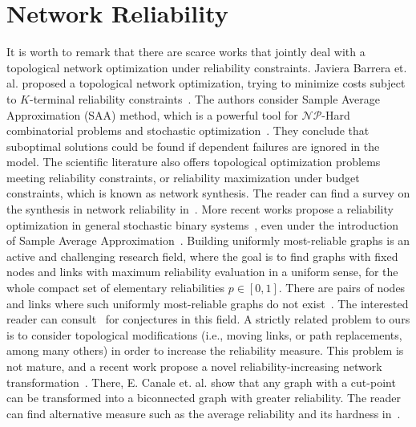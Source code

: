 \section{Network Reliability}
It is worth to remark that there are scarce works that jointly deal with a topological network optimization 
under reliability constraints. Javiera Barrera et. al. proposed a topological network optimization, trying to minimize costs subject to $K$-terminal reliability constraints~\cite{106}. The authors consider Sample Average Approximation (SAA) method, which is a powerful tool for $\mathcal{NP}$-Hard combinatorial problems and  stochastic optimization~\cite{112}. They conclude that suboptimal solutions could be found if dependent failures are ignored in the model. The scientific literature also offers topological optimization problems meeting reliability constraints, or reliability maximization under budget constraints, which is known as network synthesis. The reader can find a survey on the synthesis in network reliability in~\cite{113}. More recent works 
propose a reliability optimization in general stochastic binary systems~\cite{107}, even under the introduction of Sample Average Approximation~\cite{114}. Building uniformly most-reliable graphs is an active and challenging research field, where the goal is to find graphs with fixed nodes and links with maximum reliability evaluation in a uniform sense, for the whole compact set of elementary reliabilities $p\in [0,1]$. 
There are pairs of nodes and links where such uniformly most-reliable graphs do not exist~\cite{108}. 
The interested reader can consult~\cite{115} for conjectures in this field. A strictly related problem to ours is to consider topological modifications (i.e., moving links, or path replacements, among many others) in order to increase the reliability measure. This problem is not mature, and a recent work propose a novel reliability-increasing network transformation~\cite{110}. There, E. Canale et. al. show that any graph with a cut-point can be transformed into a biconnected graph with greater reliability. The reader can find alternative measure such as 
the average reliability and its hardness in~\cite{109}.\\ 

